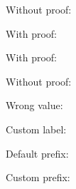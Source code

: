 \documentclass{article}
\theoremstyle{plain}
\begin{document}
Without proof:

With proof:

With proof:

Without proof:

Wrong value:

Custom label:

Default prefix:

Custom prefix:
\end{document}

